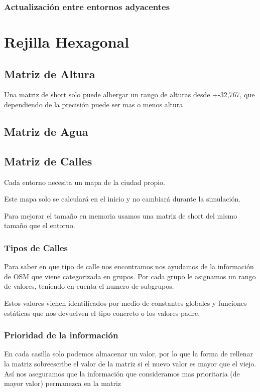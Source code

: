 \subsubsection*{Actualización entre entornos adyacentes}
\section*{Rejilla Hexagonal}
\subsection*{Matriz de Altura}
Una matriz de short solo puede albergar un rango de alturas desde +-32,767, que
dependiendo de la precisión puede ser mas o menos altura
\subsection*{Matriz de Agua}
\subsection*{Matriz de Calles}
Cada entorno necesita un mapa de la ciudad propio.

Este mapa solo se calculará en el inicio y no cambiará durante la simulación.

Para mejorar el tamaño en memoria usamos una matriz de short del mismo tamaño
que el entorno.
\subsubsection*{Tipos de Calles}
Para saber en que tipo de calle nos encontramos nos ayudamos de la información
de OSM que viene categorizada en grupos. Por cada grupo le asignamos un rango
de valores, teniendo en cuenta el numero de subgrupos.

Estos valores vienen identificados por medio de constantes globales y funciones
estáticas que nos devuelven el tipo concreto o los valores padre.
\subsubsection*{Prioridad de la información}
En cada casilla solo podemos almacenar un valor, por lo que la forma de
rellenar la matriz sobreescribe el valor de la matriz si el nuevo valor es
mayor que el viejo. Así nos aseguramos que la información que consideramos mas
prioritaria (de mayor valor) permanezca en la matriz
